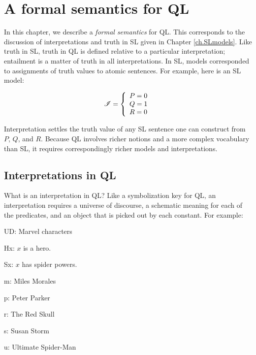 \chapter{A formal semantics for QL}
\label{ch.QL.models}

In this chapter, we describe a \emph{formal semantics} for QL. This corresponds to the discussion of interpretations and truth in SL given in Chapter \ref{ch.SLmodels}. Like truth in SL, truth in QL is defined relative to a particular interpretation; entailment is a matter of truth in all interpretations. In SL, models corresponded to assignments of truth values to atomic sentences. For example, here is an SL model:

\begin{displaymath}
\mathscr{I} =
\left\{
	\begin{array}{ll}
	P = 0\\
	Q = 1\\
	R = 0
	\end{array}
\right.
\end{displaymath}

Interpretation  settles the truth value of any SL sentence one can construct from $P$, $Q$, and $R$. Because QL involves richer notions and a more complex vocabulary than SL, it requires correspondingly richer models and interpretations.

\section{Interpretations in QL}

What is an interpretation in QL? Like a symbolization key for QL, an interpretation requires a universe of discourse, a schematic meaning for each of the predicates, and an object that is picked out by each constant. For example:

\begin{ekey}
\item[UD:] Marvel characters
\item[Hx:] $x$ is a hero.
\item[Sx:] $x$ has spider powers.
\item[m:] Miles Morales
\item[p:] Peter Parker
\item[r:] The Red Skull
\item[s:] Susan Storm
\item[u:] Ultimate Spider-Man
\end{ekey}


